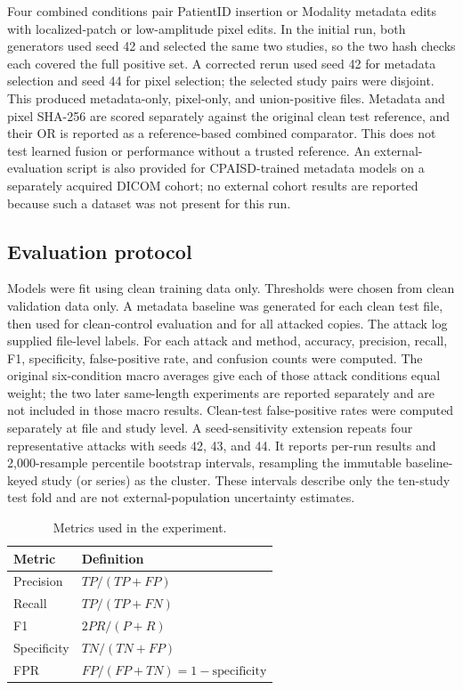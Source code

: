 \documentclass[journal]{IEEEtran}
\begin{document}
  Four combined conditions pair PatientID insertion or Modality metadata edits with localized-patch or low-amplitude pixel edits. In the initial run, both generators used seed 42 and selected the same two studies, so the two hash checks each covered the full positive set. A corrected rerun used seed 42 for metadata selection and seed 44 for pixel selection; the selected study pairs were disjoint. This produced metadata-only, pixel-only, and union-positive files. Metadata and pixel SHA-256 are scored separately against the original clean test reference, and their OR is reported as a reference-based combined comparator. This does not test learned fusion or performance without a trusted reference. An external-evaluation script is also provided for CPAISD-trained metadata models on a separately acquired DICOM cohort; no external cohort results are reported because such a dataset was not present for this run.
  
  \subsection{Evaluation protocol}
  Models were fit using clean training data only. Thresholds were chosen from clean validation data only. A metadata baseline was generated for each clean test file, then used for clean-control evaluation and for all attacked copies. The attack log supplied file-level labels. For each attack and method, accuracy, precision, recall, F1, specificity, false-positive rate, and confusion counts were computed. The original six-condition macro averages give each of those attack conditions equal weight; the two later same-length experiments are reported separately and are not included in those macro results. Clean-test false-positive rates were computed separately at file and study level. A seed-sensitivity extension repeats four representative attacks with seeds 42, 43, and 44. It reports per-run results and 2,000-resample percentile bootstrap intervals, resampling the immutable baseline-keyed study (or series) as the cluster. These intervals describe only the ten-study test fold and are not external-population uncertainty estimates.
  
  \begin{table}[t]
  \caption{Metrics used in the experiment.}
  \label{tab:metrics}
  \centering\footnotesize
  \begin{tabular}{ll}
  \toprule
  Metric & Definition \\
  \midrule
  Precision & $TP/(TP+FP)$ \\
  Recall & $TP/(TP+FN)$ \\
  F1 & $2PR/(P+R)$ \\
  Specificity & $TN/(TN+FP)$ \\
  FPR & $FP/(FP+TN)=1-\mathrm{specificity}$ \\
  \bottomrule
  \end{tabular}
  \end{table}
  
\end{document}
